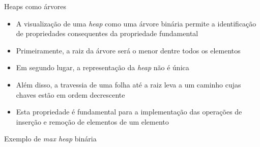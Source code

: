 \begin{frame}[fragile]{Heaps como árvores}

    \begin{itemize}
        \item A visualização de uma \textit{heap} como uma árvore binária permite a 
            identificação de propriedades consequentes da propriedade fundamental

        \item Primeiramente, a raiz da árvore será o menor dentre todos os elementos

        \item Em segundo lugar, a representação da \textit{heap} não é única

        \item Além disso, a travessia de uma folha até a raiz leva a um caminho cujas chaves
            estão em ordem decrescente

        \item Esta propriedade é fundamental para a implementação das operações de inserção e
            remoção de elementos de um elemento
    \end{itemize}

\end{frame}

\begin{frame}[fragile]{Exemplo de {\it max heap} binária}

    \begin{figure}
        \centering
    \end{figure}

\end{frame}

